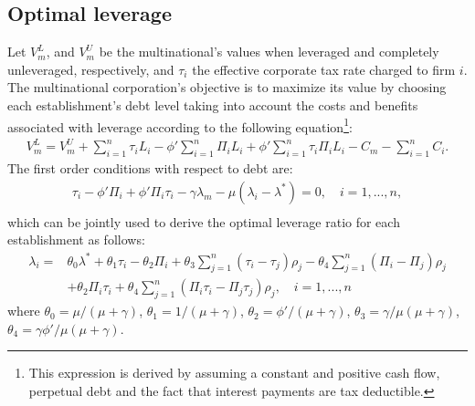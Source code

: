 \documentclass[12pt]{article}
\begin{document}
	\subsection{Optimal leverage}
	\label{subsec:opt_leverage}
	Let $V_m^L$, and $V_m^U$ be the multinational's values when leveraged and completely unleveraged, respectively, and $\tau_{i}$ the effective corporate tax rate charged to firm $i$. The multinational corporation's objective is to maximize its value by choosing each establishment's debt level taking into account the costs and benefits associated with leverage according to the following equation\footnote{This expression is derived by assuming a constant and positive cash flow, perpetual debt and the fact that interest payments are tax deductible.}:
	\begin{equation}
	\begin{aligned}
	V_m^L=V_m^U+\sum_{i=1}^{n}\tau_iL_i-\phi'\sum_{i=1}^{n}\Pi_iL_i+\phi'\sum_{i=1}^{n}\tau_i\Pi_i L_i-C_m-\sum_{i=1}^{n}C_i.
	\end{aligned}
	\label{eq:v_l}
	\end{equation}
    The first order conditions with respect to debt are:
	\begin{equation}
	\begin{aligned}
	\tau_i-\phi'\Pi_i+\phi'\Pi_i\tau_{i}-\gamma\lambda_m-\mu(\lambda_i-\lambda^*)=0, \quad i=1,...,n,\\
	\end{aligned}
	\label{eq:FOC}
	\end{equation}
	which can be jointly used to derive the optimal leverage ratio for each establishment as follows:  
	\begin{equation}
	\begin{aligned}
	\lambda_i=&\theta_0\lambda^*+\theta_1\tau_i-\theta_2\Pi_i+\theta_3\sum_{j=1}^{n}(\tau_i-\tau_j)\rho_j-\theta_4\sum_{j=1}^{n}(\Pi_i-\Pi_j)\rho_j\\
	&+\theta_2\Pi_i\tau_{i}+\theta_4\sum_{j=1}^{n}(\Pi_i\tau_i-\Pi_j\tau_j)\rho_j, \quad i=1,...,n
	\end{aligned}
	\label{eq:optimal leverage in theory}
	\end{equation}
	where $ \theta_0=\mu/(\mu+\gamma)$, $\theta_1=1/(\mu+\gamma)$, 
	$\theta_2=\phi'/(\mu+\gamma)$, 
	$\theta_3=\gamma/\mu(\mu+\gamma)$, 
	$\theta_4=\gamma\phi'/\mu(\mu+\gamma)$.
	
\end{document}
